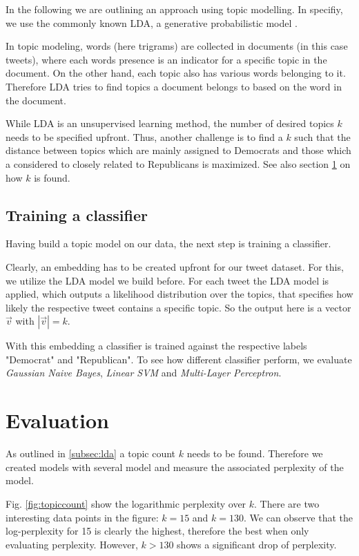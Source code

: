 \documentclass[sigconf, nonacm]{acmart}
\begin{document}
In the following we are outlining an approach using topic modelling. In specifiy, we use the commonly known LDA, a generative probabilistic model \cite{lda}.

In topic modeling, words (here trigrams) are collected in documents (in this case tweets), where each words presence is an indicator for a specific topic in the document. On the other hand, each topic also has various words belonging to it. Therefore LDA tries to find topics a document belongs to based on the word in the document.

While LDA is an unsupervised learning method, the number of desired topics $k$ needs to be specified upfront. Thus, another challenge is to find a $k$ such that the distance between topics which are mainly assigned to Democrats and those which a considered to closely related to Republicans is maximized. See also section \ref{sec:eval} on how $k$ is found.

\subsection{Training a classifier}
\label{subsec:classify}
Having build a topic model on our data, the next step is training a classifier.

Clearly, an embedding has to be created upfront for our tweet dataset. For this, we utilize the LDA model we build before. For each tweet the LDA model is applied, which outputs a likelihood distribution over the topics, that 
specifies how likely the respective tweet contains a specific topic. So the output here is a vector $\vec{v}$ with $|\vec{v}|=k$.

With this embedding a classifier is trained against the respective labels "Democrat" and "Republican". To see how different classifier perform, we evaluate \textit{Gaussian Naive Bayes}, \textit{Linear SVM} and \textit{Multi-Layer Perceptron}.

\section{Evaluation}
\label{sec:eval}
As outlined in \ref{subsec:lda} a topic count $k$ needs to be found. Therefore we created models with several model and measure the associated perplexity of the model.

Fig. \ref{fig:topiccount} show the logarithmic perplexity over $k$. There are two interesting data points in the figure: $k=15$ and $k=130$. We can observe that the log-perplexity for 15 is clearly the highest, therefore the best when only evaluating perplexity. However, $k > 130$ shows a significant drop of perplexity.
\end{document}
